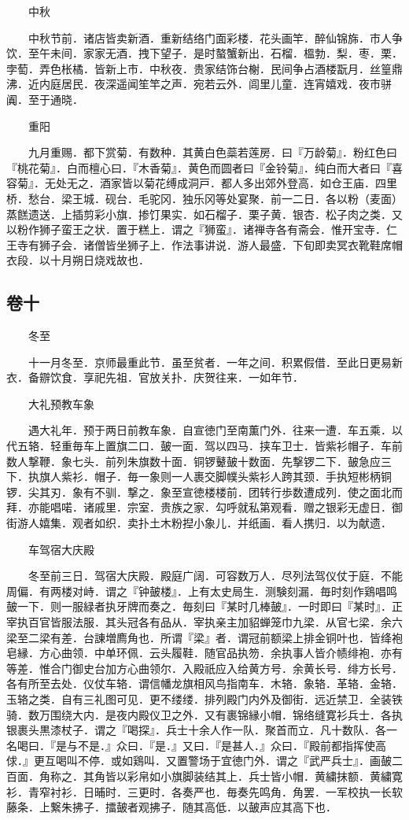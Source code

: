 　　中秋

　　中秋节前．诸店皆卖新酒．重新结络门面彩楼．花头画竿．醉仙锦旆．市人争饮．至午未间．家家无酒．拽下望子．是时螯蟹新出．石榴．榲勃．梨．枣．栗．孛萄．弄色枨橘．皆新上市．中秋夜．贵家结饰台榭．民间争占酒楼翫月．丝篁鼎沸．近内庭居民．夜深遥闻笙竿之声．宛若云外．闾里儿童．连宵嬉戏．夜市骈阗．至于通晓．

　　重阳

　　九月重赐．都下赏菊．有数种．其黄白色蘂若莲房．曰『万龄菊』．粉红色曰『桃花菊』．白而檀心曰．『木香菊』．黄色而圆者曰『金铃菊』．纯白而大者曰『喜容菊』．无处无之．酒家皆以菊花缚成洞戸．都人多出郊外登高．如仓王庙．四里桥．愁台．梁王城．砚台．毛驼冈．独乐冈等处宴聚．前一二日．各以粉（麦面）蒸餻遗送．上插剪彩小旗．掺饤果实．如石榴子．栗子黄．银杏．松子肉之类．又以粉作狮子蛮王之状．置于糕上．谓之『狮蛮』．诸禅寺各有斋会．惟开宝寺．仁王寺有狮子会．诸僧皆坐狮子上．作法事讲说．游人最盛．下旬即卖冥衣靴鞋席帽衣段．以十月朔日烧戏故也．

\hypertarget{ux5377ux5341}{%
\subsection{卷十}\label{ux5377ux5341}}

　　冬至

　　十一月冬至．京师最重此节．虽至贫者．一年之间．积累假借．至此日更易新衣．备辧饮食．享祀先祖．官放关扑．庆贺往来．一如年节．

　　大礼预教车象

　　遇大礼年．预于两日前教车象．自宣徳门至南薫门外．往来一遭．车五乘．以代五辂．轻重毎车上置旗二口．皷一面．驾以四马．挟车卫士．皆紫衫帽子．车前数人撃鞭．象七头．前列朱旗数十面．铜锣鼙皷十数面．先撃锣二下．皷急应三下．执旗人紫衫．帽子．毎一象则一人裹交脚幞头紫衫人跨其颈．手执短彬柄铜锣．尖其刃．象有不驯．撃之．象至宣徳楼楼前．团转行歩数遭成列．使之面北而拜．亦能唱喏．诸戚里．宗室．贵族之家．勾呼就私第观看．赠之银彩无虚日．御街游人嬉集．观者如织．卖扑土木粉揑小象儿．并纸画．看人携归．以为献遗．

　　车驾宿大庆殿

　　冬至前三日．驾宿大庆殿．殿庭广阔．可容数万人．尽列法驾仪仗于庭．不能周偏．有两楼对峙．谓之『钟皷楼』．上有太史局生．测験刻漏．毎时刻作鶏唱鸣皷一下．则一服緑者执牙牌而奏之．毎刻曰『某时几棒皷』．一时即曰『某时』．正宰执百官皆服法服．其头冠各有品从．宰执亲主加貂蝉笼巾九梁．从官七梁．余六梁至二梁有差．台諌増廌角也．所谓『梁』者．谓冠前额梁上排金铜叶也．皆绛袍皂縁．方心曲领．中单环佩．云头履鞋．随官品执笏．余执事人皆介帻绯袍．亦有等差．惟合门御史台加方心曲领尔．入殿祇应入给黄方号．余黄长号．绯方长号．各有所至去处．仪仗车辂．谓信幡龙旗相风鸟指南车．木辂．象辂．革辂．金辂．玉辂之类．自有三礼图可见．更不缕缕．排列殿门内外及御街．远近禁卫．全装铁骑．数万围绕大内．是夜内殿仪卫之外．又有裹锦縁小帽．锦络缝寛衫兵士．各执银裹头黒漆杖子．谓之『喝探』．兵士十余人作一队．聚首而立．凡十数队．各一名喝曰．『是与不是．』众曰．『是．』又曰．『是甚人．』众曰．『殿前都指挥使高俅．』更互喝叫不停．或如鶏叫．又置警场于宜徳门外．谓之『武严兵士』．画皷二百面．角称之．其角皆以彩帛如小旗脚装结其上．兵士皆小帽．黄繍抹额．黄繍寛衫．青窄衬衫．日晡时．三更时．各奏严也．毎奏先鸣角．角罢．一军校执一长软藤条．上繋朱拂子．擂皷者观拂子．随其高低．以皷声应其高下也．

